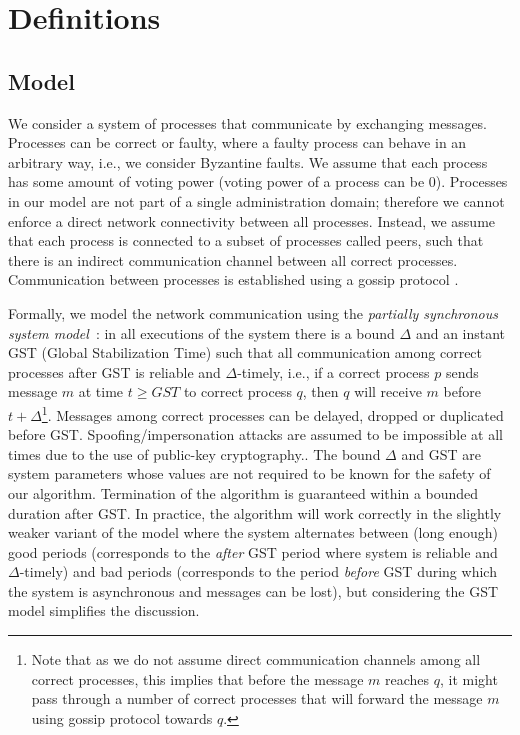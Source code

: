 \section{Definitions}
\label{sec:definitions}

\subsection{Model}

We consider a system of processes that communicate by exchanging messages.
Processes can be correct or faulty, where a faulty process can behave in an arbitrary way,
 i.e., we consider Byzantine faults. We assume that each process has some amount of voting power (voting power of a process can be $0$).
Processes in our model are not part of a single administration domain; therefore we cannot enforce a direct network connectivity between all processes. Instead, we assume that each process is connected to a subset of processes called peers, 
such that there is an indirect communication channel between all correct processes. Communication between processes is established using a gossip protocol \cite{Dem1987:gossip}.

Formally, we model the network communication using the \emph{partially synchronous system model}~\cite{DLS88:jacm}: in all executions
of the system there is a bound $\Delta$ and an instant GST (Global Stabilization Time) such that all communication among correct processes 
after GST is reliable and $\Delta$-timely, i.e., if a correct process $p$ sends message $m$ at time $t \ge GST$ to correct process $q$, then $q$ will receive $m$ before $t + \Delta$\footnote{Note that as we do not assume direct communication channels among all correct processes, this implies that before the message $m$ reaches $q$, it might pass through a number of 
	correct processes that will forward the message $m$ using gossip protocol towards $q$.}. Messages among correct processes can be delayed, dropped or duplicated before GST. Spoofing/impersonation attacks are assumed to be impossible at all times due to the use of public-key cryptography.. 
The bound $\Delta$ and GST are system parameters whose values are not required to be known for the safety of our algorithm. Termination of the algorithm is guaranteed within a bounded duration after GST.
In practice, the algorithm will work correctly in the slightly weaker variant of the model where the system alternates between (long enough) good periods (corresponds to the \emph{after} GST period where system is reliable and $\Delta$-timely) and bad periods (corresponds to the period \emph{before} GST during which the system is asynchronous and messages can be lost), but considering the GST model simplifies the discussion.  

